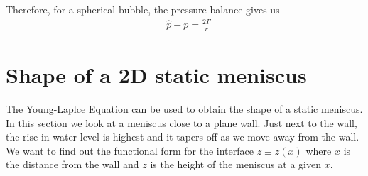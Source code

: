 \documentclass[11pt,a4paper]{article}
\newcommand{\1}{\vect{1}}
\begin{document}
Therefore, for a spherical bubble, the pressure balance gives us
\begin{align*}
&\hat p - p  = \frac{2 \Gamma}{r}
\end{align*}

\section{Shape of a 2D static meniscus}
The Young-Laplce Equation can be used to obtain the shape of a static meniscus. In this section we look at a meniscus close to a plane wall. Just next to the wall, the rise in water level is highest and it tapers off as we move away from the wall. We want to find out the functional form for the interface $z \equiv z(x)$ where $x$ is the distance from the wall and $z$ is the height of the meniscus at a given $x$. 
\end{document}
